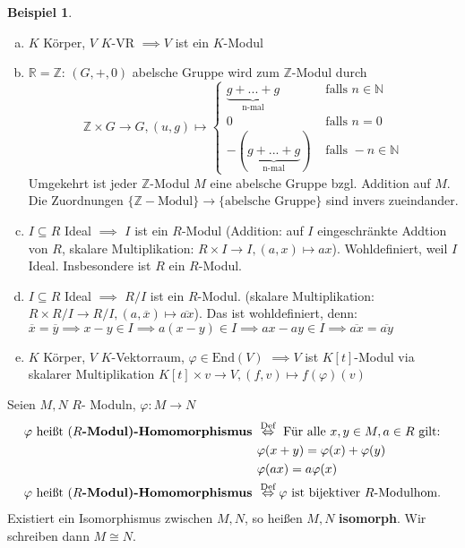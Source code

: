 \documentclass[a4paper, titlepage]{article}
\theoremstyle{definition}
\newtheorem{bsp}[satz]{Beispiel}
\newcommand{\N}{\mathbb{N}}
\newcommand{\R}{\mathbb{R}}
\newcommand{\Z}{\mathbb{Z}}
\newcommand{\End}{\mathrm{End}}
\begin{document}
        \begin{bsp}
            \begin{enumerate}[(a)]
                \item $K$ Körper, $V$ $K$-VR $\implies V$ ist ein $K$-Modul
                \item $\R=\Z$: $(G,+,0)$ abelsche Gruppe wird zum $\Z$-Modul durch 
                $$\Z \times G \longrightarrow G, (u,g) \mapsto \left\{\begin{array}{cc}
                    \underbrace{g+...+g}_{\text{n-mal}}& \text{ falls }n\in \N\\
                    0 & \text{ falls }n=0\\
                    -(\underbrace{g+...+g}_{\text{n-mal}})& \text{ falls }-n\in \N
                \end{array}\right.$$
                Umgekehrt ist jeder $\Z$-Modul $M$ eine abelsche Gruppe bzgl. Addition auf $M$.
                Die Zuordnungen $\{\Z-\text{Modul}\}\longrightarrow \{\text{abelsche Gruppe}\}$ sind invers zueindander.
                \item $I\subseteq R$ Ideal $\implies $ $I$ ist ein $R$-Modul (Addition: auf $I$ eingeschränkte Addtion von $R$, skalare Multiplikation: $R\times I \longrightarrow I, (a,x)\mapsto ax$). Wohldefiniert, weil $I$ Ideal. Insbesondere ist $R$ ein $R$-Modul.
                \item $I\subseteq R$ Ideal $\implies$ $R/I$ ist ein $R$-Modul. (skalare Multiplikation: $R\times R/I\longrightarrow R/I, (a,\overline{x})\mapsto \overline{ax}$). Das ist wohldefiniert, denn: $\overline{x}=\overline{y}\implies x-y\in I\implies a(x-y)\in I \implies ax-ay\in I \implies \overline{ax}=\overline{ay}$
                \item $K$ Körper, $V$ $K$-Vektorraum, $\varphi\in \End(V)$\newline
                $\implies V $ ist $K[t]$-Modul via skalarer Multiplikation $K[t]\times v\longrightarrow V, (f,v)\mapsto f(\varphi)(v)$
            \end{enumerate}
        \end{bsp}
        \begin{definition}
            Seien $M,N$ $R$- Moduln, $\varphi: M\longrightarrow N$
            \begin{align*}
                \varphi \text{ heißt }(R\text{\textbf{-Modul)-Homomorphismus }}&\overset{\text{Def}}{\Leftrightarrow}\text{ Für alle }x,y\in M, a\in R \text{ gilt:}\\
                &\varphi(x+y)=\varphi(x)+\varphi(y)\\
                &\varphi(ax)=a\varphi(x)\\
                \varphi \text{ heißt }(R\text{\textbf{-Modul)-Homomorphismus }}&\overset{\text{Def}}{\Leftrightarrow} \varphi \text{ ist bijektiver }R\text{-Modulhom.}
            \end{align*}
            Existiert ein Isomorphismus zwischen $M,N$, so heißen $M,N$ \textbf{isomorph}. Wir schreiben dann $M\cong N.$
        \end{definition}
\end{document}
